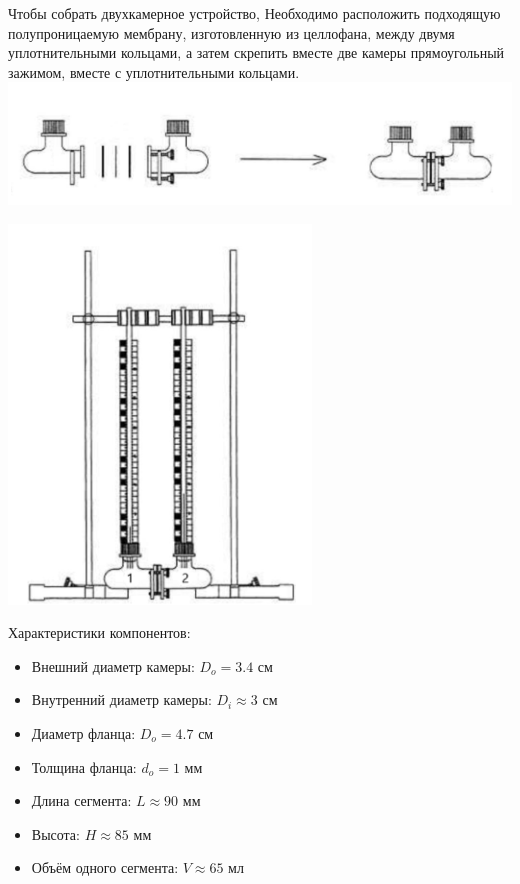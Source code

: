 \documentclass{article}
\begin{document}
            \hspace*{4mm}Чтобы собрать двухкамерное устройство,
            Необходимо расположить подходящую полупроницаемую мембрану,
            изготовленную из целлофана, между двумя уплотнительными кольцами, а затем
            скрепить вместе две камеры прямоугольный зажимом, вместе с
            уплотнительными кольцами. \\

            \includegraphics[scale=0.65]{tools2.png} \\

            \begin{center}
                \includegraphics[scale=0.8]{tools3.png}
                \vspace*{4mm}
            \end{center}

            Характеристики компонентов:

            \begin{itemize}
                \item Внешний диаметр камеры: $D_o = 3.4$ см
                \item Внутренний диаметр камеры: $D_i \approx 3$ см
                \item Диаметр фланца: $D_o = 4.7$ см
                \item Толщина фланца: $d_o = 1$ мм
                \item Длина сегмента: $L \approx 90$ мм
                \item Высота: $H \approx 85$ мм
                \item Объём одного сегмента: $V \approx 65$ мл
            \end{itemize}
            \newpage
\end{document}
